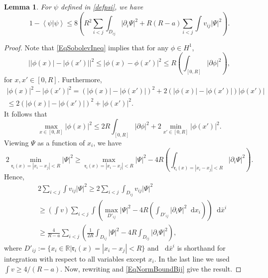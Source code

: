 \documentclass[a4paper,11pt]{article}
\newcommand{\abs}[1]{\left\lvert #1 \right\rvert}
\renewcommand{\braket}[1]{\left\langle#1\right\rangle}
\newcommand*\diff{\mathop{}\!\mathrm{d}}
\newcommand{\R}{\mathbb{R}}
\newtheorem{lemma}[theorem]{Lemma}
\numberwithin{equation}{section}
\begin{document}
	\begin{lemma}\label{LemmaNormLoss}
		For $ \psi $ defined in \eqref{defpsi}, we have \begin{equation}
			\label{eqlemmanormloss}
			1-\braket{\psi|\psi}\leq8 \left(R^2\sum_{i<j}\int_{D_{ij}}\abs{\partial_i \Psi}^2+R(R-a)\sum_{i<j}\int v_{ij} \abs{\Psi}^2\right).
		\end{equation}
	\end{lemma}
	\begin{proof}
		Note that \eqref{EqSobolevIneq} implies that for any $ \phi\in H^1 $, \begin{equation}
			\abs{\abs{\phi(x)}-\abs{\phi(x')}}^2\leq\abs{\phi(x)-\phi(x')}^2\leq R\left(\int_{[0,R]}\abs{\partial \phi}^2\right),
		\end{equation}
		for $ x,x'\in[0,R] $. Furthermore, 
		\begin{equation}
			\begin{aligned}
				\abs{\phi(x)}^2-\abs{\phi(x')}^2=\left(\abs{\phi(x)}-\abs{\phi(x')}\right)^2+2\left(\abs{\phi(x)}-\abs{\phi(x')}\right)\abs{\phi(x')}\\\leq 2\left(\abs{\phi(x)}-\abs{\phi(x')}\right)^2+\abs{\phi(x')}^2.
			\end{aligned}
		\end{equation}
		It follows that \begin{equation}
			\max_{x\in[0,R]}\abs{\phi(x)}^2\leq 2R\int_{[0,R]}\abs{\partial \phi}^2+2\min_{x'\in[0,R]}\abs{\phi(x')}^2.
		\end{equation}
		Viewing $ \Psi $ as a function of $ x_i $, we have \begin{equation}
			2\min_{\mathfrak{r}_i(x)=\abs{x_i-x_j}<R}\abs{\Psi}^2\geq \max_{\mathfrak{r}_i(x)=\abs{x_i-x_j}<R}\abs{\Psi}^2-4R\left(\int_{{\mathfrak{r}_i(x)=\abs{x_i-x_j}<R}}\abs{\partial_i \Psi}^2\right).
		\end{equation}
		Hence, \begin{equation}
			\begin{aligned}
				&2\sum_{i<j}\int v_{ij} \abs{\Psi}^2\geq 2\sum_{i<j} \int_{D_{ij}} v_{ij} \abs{\Psi}^2 \\&\geq \left(\int v\right)\sum_{i< j}\int\left(\max_{D'_{ij}}\abs{\Psi}^2-4R\left(\int_{D'_{ij}}\abs{\partial_i\Psi}^2\diff x_i\right)\right)\diff \bar{x}^i\\
				&\geq \frac{4}{R-a}\sum_{i< j}\left(\frac{1}{2R}\int_{D_{ij}}\abs{\Psi}^2-4R\int_{D_{ij}}\abs{\partial_i\Psi}^2\right),
			\end{aligned}
		\end{equation}
		where $ D'_{ij}:=\{x_i\in \R \vert \mathfrak{r}_i(x)=\abs{x_i-x_j}<R \} $ and $\diff \bar{x}^i$ is shorthand for integration with respect to all variables except $x_i$. In the last line we used $\int v\geq 4/(R-a)$. Now, rewriting and \eqref{EqNormBoundBij} give the result.
	\end{proof}
	
\end{document}
